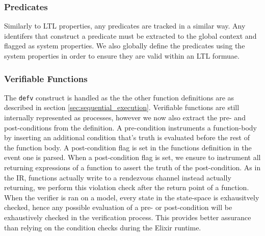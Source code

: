 \subsubsection{Predicates}
Similarly to LTL properties, any predicates are tracked in a similar way. Any identifers that construct a predicate must be extracted to the global context and flagged as system properties. We also globally define the predicates using the system properties in order to ensure they are valid within an LTL formuae.
\par
\subsubsection{Verifiable Functions}
The \texttt{defv} construct is handled as the the other function definitions are as described in section \ref{sec:sequential_execution}. Verifiable functions are still internally represented as processes, however we now also extract the pre- and post-conditions from the definition. A pre-condition instruments a function-body by inserting an additional condition that's truth is evaluated before the rest of the function body. A post-condition flag is set in the functions definition in the event one is parsed. When a post-condition flag is set, we ensure to instrument all returning expressions of a function to assert the truth of the post-condition. As in the IR, functions actually write to a rendezvous channel instead actually returning, we perform this violation check after the return point of a function. When the verifier is ran on a model, every state in the state-space is exhausitvely checked, hence any possible evaluation of a pre- or post-condition will be exhaustively checked in the verification process. This provides better assurance than relying on the condition checks during the Elixir runtime.

